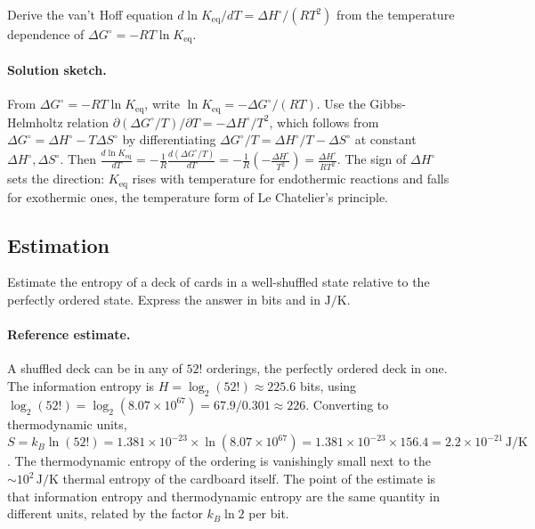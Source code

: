\begin{exercise}
Derive the van't Hoff equation $d \ln K_{\text{eq}}/dT = \Delta
H^\circ/(RT^2)$ from the temperature dependence of $\Delta G^\circ =
-RT \ln K_{\text{eq}}$.

\paragraph{Solution sketch.} From $\Delta G^\circ = -RT \ln
K_{\text{eq}}$, write $\ln K_{\text{eq}} = -\Delta G^\circ/(RT)$.
Use the Gibbs-Helmholtz relation
$\partial(\Delta G^\circ/T)/\partial T = -\Delta H^\circ/T^2$, which
follows from $\Delta G^\circ = \Delta H^\circ - T\Delta S^\circ$ by
differentiating $\Delta G^\circ/T = \Delta H^\circ/T - \Delta S^\circ$
at constant $\Delta H^\circ, \Delta S^\circ$. Then
$\frac{d \ln K_{\text{eq}}}{dT} = -\frac{1}{R}
\frac{d(\Delta G^\circ/T)}{dT}
= -\frac{1}{R}\left(-\frac{\Delta H^\circ}{T^2}\right)
= \frac{\Delta H^\circ}{RT^2}$.
The sign of $\Delta H^\circ$ sets the direction: $K_{\text{eq}}$ rises
with temperature for endothermic reactions and falls for exothermic
ones, the temperature form of Le Chatelier's principle.
\end{exercise}

\subsection*{Estimation}

\begin{exercise}
Estimate the entropy of a deck of cards in a well-shuffled state
relative to the perfectly ordered state. Express the answer in bits
and in $\text{J}/\si{\kelvin}$.

\paragraph{Reference estimate.} A shuffled deck can be in any of
$52!$ orderings, the perfectly ordered deck in one. The information
entropy is $H = \log_2(52!) \approx 225.6$ bits, using
$\log_2(52!) = \log_2(8.07 \times 10^{67}) = 67.9/0.301 \approx 226$.
Converting to thermodynamic units, $S = k_B \ln(52!) =
1.381 \times 10^{-23} \times \ln(8.07 \times 10^{67})
= 1.381 \times 10^{-23} \times 156.4 = 2.2 \times 10^{-21}\,
\si{\joule\per\kelvin}$. The thermodynamic entropy of the ordering is
vanishingly small next to the $\sim 10^2\,\si{\joule\per\kelvin}$
thermal entropy of the cardboard itself. The point of the estimate is
that information entropy and thermodynamic entropy are the same quantity
in different units, related by the factor $k_B \ln 2$ per bit.
\end{exercise}

